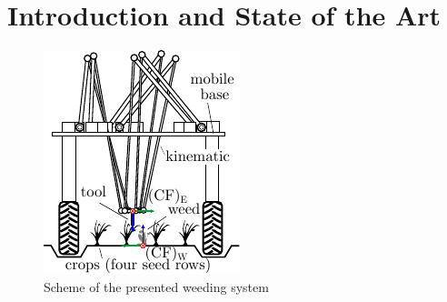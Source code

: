 \documentclass[runningheads]{llncs}
\begin{document}
\section{Introduction and State of the Art}
\begin{figure}
    \centering
	\vspace{-8mm}
	\includegraphics[width=1.0\linewidth]{weeding_system.pdf}
	\caption{Scheme of the presented weeding system}
	\label{fig:application_scenario}
	\vspace{-7mm}
\end{figure}
\end{document}
